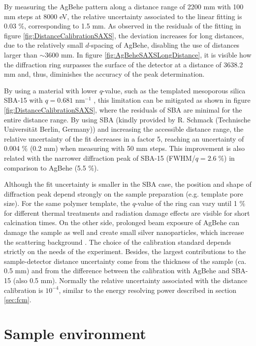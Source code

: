 By measuring the AgBehe pattern along a distance range of 2200 mm with 100 mm steps at 8000 eV, the relative uncertainty associated to the linear fitting is 0.03 $\%$, corresponding to 1.5 mm. As observed in the residuals of the fitting in figure \ref{fig:DistanceCalibrationSAXS}, the deviation increases for long distances, due to the relatively small $d$-spacing of AgBehe, disabling the use of distances larger than $\sim 3600$ mm. In figure \ref{fig:AgBeheSAXSLongDistance}, it is visible how the diffraction ring surpasses the surface of the detector at a distance of 3638.2 mm and, thus, diminishes the accuracy of the peak determination.

By using a material with lower $q$-value, such as the templated mesoporous silica SBA-15 with $q=0.681$ nm$^{-1}$ \citep{zhao_triblock_1998}, this limitation can be mitigated as shown in figure \ref{fig:DistanceCalibrationSAXS}, where the residuals of SBA are minimal for the entire distance range. By using SBA (kindly provided by R. Schmack (Technische Universität Berlin, Germany)) and increasing the accessible distance range, the relative uncertainty of the fit decreases in a factor 5, reaching an uncertainty of 0.004 $\%$ (0.2 mm) when measuring with 50 mm steps. This improvement is also related with the narrower diffraction peak of SBA-15 (FWHM/$q=2.6\;\%$) in comparison to AgBehe (5.5 $\%$).

Although the fit uncertainty is smaller in the SBA case, the position and shape of diffraction peak depend strongly on the sample preparation (e.g. template pore size). For the same polymer template, the $q$-value of the ring can vary until 1 $\%$ for different thermal treatments and radiation damage effects are visible for short calcination times. On the other side, prolonged beam exposure of AgBehe can damage the sample as well and create small silver nanoparticles, which increase the scattering background \citep{liu_thermal_2006}. The choice of the calibration standard depends strictly on the needs of the experiment. Besides, the largest contributions to the sample-detector distance uncertainty come from the thickness of the sample (ca. 0.5 mm) and from the difference between the calibration with AgBehe and SBA-15 (also 0.5 mm). Normally the relative uncertainty associated with the distance calibration is $10^{-4}$, similar to the energy resolving power described in section \ref{sec:fcm}.

\section{Sample environment}
\label{sec:sample_environment}

